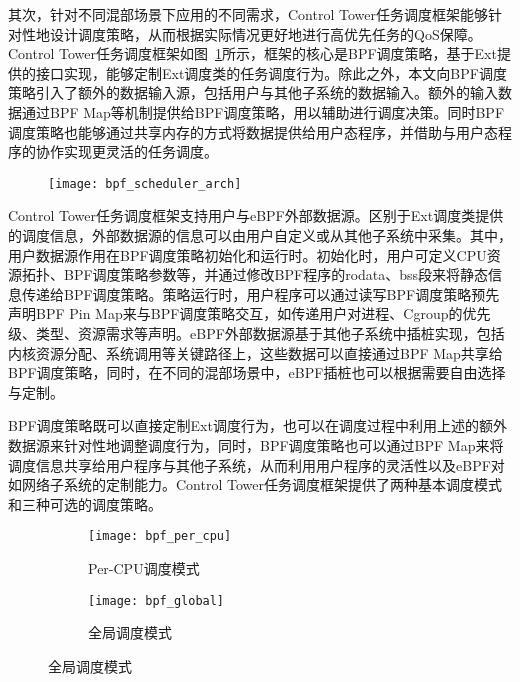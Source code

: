 其次，针对不同混部场景下应用的不同需求，Control Tower任务调度框架能够针对性地设计调度策略，从而根据实际情况更好地进行高优先任务的QoS保障。Control Tower任务调度框架如图~\ref{fig:bpf_scheduler_arch}所示，框架的核心是BPF调度策略，基于Ext提供的接口实现，能够定制Ext调度类的任务调度行为。除此之外，本文向BPF调度策略引入了额外的数据输入源，包括用户与其他子系统的数据输入。额外的输入数据通过BPF Map等机制提供给BPF调度策略，用以辅助进行调度决策。同时BPF调度策略也能够通过共享内存的方式将数据提供给用户态程序，并借助与用户态程序的协作实现更灵活的任务调度。

\begin{figure}[H]
    \centering
    \texttt{[image: bpf\_scheduler\_arch]}
    \label{fig:bpf_scheduler_arch}
\end{figure}

Control Tower任务调度框架支持用户与eBPF外部数据源。区别于Ext调度类提供的调度信息，外部数据源的信息可以由用户自定义或从其他子系统中采集。其中，用户数据源作用在BPF调度策略初始化和运行时。初始化时，用户可定义CPU资源拓扑、BPF调度策略参数等，并通过修改BPF程序的rodata、bss段来将静态信息传递给BPF调度策略。策略运行时，用户程序可以通过读写BPF调度策略预先声明BPF Pin Map来与BPF调度策略交互，如传递用户对进程、Cgroup的优先级、类型、资源需求等声明。eBPF外部数据源基于其他子系统中插桩实现，包括内核资源分配、系统调用等关键路径上，这些数据可以直接通过BPF Map共享给BPF调度策略，同时，在不同的混部场景中，eBPF插桩也可以根据需要自由选择与定制。

BPF调度策略既可以直接定制Ext调度行为，也可以在调度过程中利用上述的额外数据源来针对性地调整调度行为，同时，BPF调度策略也可以通过BPF Map来将调度信息共享给用户程序与其他子系统，从而利用用户程序的灵活性以及eBPF对如网络子系统的定制能力。Control Tower任务调度框架提供了两种基本调度模式和三种可选的调度策略。


\begin{figure}[!htbp]
    \centering
    \begin{subfigure}[b]{0.49\textwidth}
        \texttt{[image: bpf\_per\_cpu]}
        \caption{Per-CPU调度模式}
        \label{fig:bpf_per_cpu}
    \end{subfigure}
    \begin{subfigure}[b]{0.49\textwidth}
        \texttt{[image: bpf\_global]}
        \caption{全局调度模式}
        \label{fig:bpf_global}
    \end{subfigure}
\label{fig:bpf_sched_mode}
\end{figure}

